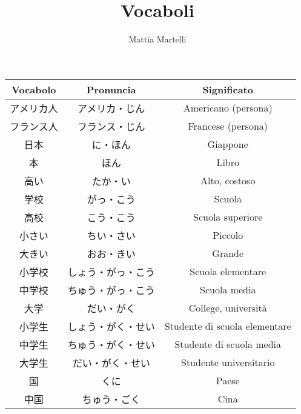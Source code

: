 \documentclass{article}
\title{Vocaboli}
\author{Mattia Martelli}
\date{}
\let\ita\textitalian
\newcommand{\itabf}[1]{\ita{\textbf{#1}}}
\begin{document}
    
    \maketitle

    \begin{center}
        \begin{japanese}
            \begin{longtable}{|c|c|c|}
                \hline
                \itabf{Vocabolo} & \itabf{Pronuncia} & \itabf{Significato}\\
                \hline\hline
                アメリカ人 & アメリカ・じん & \ita{Americano (persona)}\\
                \hline
                フランス人 & フランス・じん & \ita{Francese (persona)}\\
                \hline
                日本 & に・ほん & \ita{Giappone}\\
                \hline
                本 & ほん & \ita{Libro}\\
                \hline
                高い & たか・い & \ita{Alto, costoso}\\
                \hline
                学校 & がっ・こう & \ita{Scuola}\\
                \hline
                高校 & こう・こう & \ita{Scuola superiore}\\
                \hline
                小さい & ちい・さい & \ita{Piccolo}\\
                \hline
                大きい & おお・きい & \ita{Grande}\\
                \hline
                小学校 & しょう・がっ・こう & \ita{Scuola elementare}\\
                \hline
                中学校 & ちゅう・がっ・こう & \ita{Scuola media}\\
                \hline
                大学 & だい・がく & \ita{College, università}\\
                \hline
                小学生 & しょう・がく・せい & \ita{Studente di scuola elementare}\\
                \hline
                中学生 & ちゅう・がく・せい & \ita{Studente di scuola media}\\
                \hline
                大学生 & だい・がく・せい & \ita{Studente universitario}\\
                \hline
                国 & くに & \ita{Paese}\\
                \hline
                中国 & ちゅう・ごく & \ita{Cina}\\

\end{longtable}
\end{japanese}
\end{center}
\end{document}
